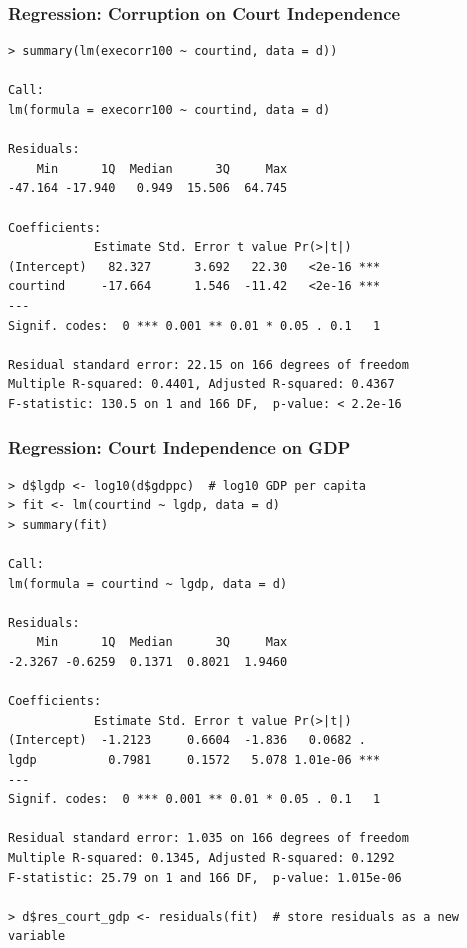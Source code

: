 \documentclass[xcolor=svgnames,9pt,english,aspectratio=169,t]{beamer}
\begin{document}
\begin{frame}[fragile]
\frametitle{Regression: Corruption on Court Independence}
\begin{Verbatim}[fontsize=\footnotesize, frame=single, label=R Code, commandchars=\\\{\}]
> summary(lm(execorr100 ~ courtind, data = d))

Call:
lm(formula = execorr100 ~ courtind, data = d)

Residuals:
    Min      1Q  Median      3Q     Max
-47.164 -17.940   0.949  15.506  64.745

Coefficients:
            Estimate Std. Error t value Pr(>|t|)
(Intercept)   82.327      3.692   22.30   <2e-16 ***
courtind     -17.664      1.546  -11.42   <2e-16 ***
---
Signif. codes:  0 *** 0.001 ** 0.01 * 0.05 . 0.1   1

Residual standard error: 22.15 on 166 degrees of freedom
Multiple R-squared: 0.4401,	Adjusted R-squared: 0.4367
F-statistic: 130.5 on 1 and 166 DF,  p-value: < 2.2e-16
\end{Verbatim}

\end{frame}

\begin{frame}[fragile]
\frametitle{Regression: Court Independence on GDP}
\footnotesize
{}
\begin{Verbatim}[fontsize=\footnotesize, frame=single, label=R Code, commandchars=\\\{\}]
> d$lgdp <- log10(d$gdppc)  # log10 GDP per capita
> fit <- lm(courtind ~ lgdp, data = d)
> summary(fit)

Call:
lm(formula = courtind ~ lgdp, data = d)

Residuals:
    Min      1Q  Median      3Q     Max
-2.3267 -0.6259  0.1371  0.8021  1.9460

Coefficients:
            Estimate Std. Error t value Pr(>|t|)
(Intercept)  -1.2123     0.6604  -1.836   0.0682 .
lgdp          0.7981     0.1572   5.078 1.01e-06 ***
---
Signif. codes:  0 *** 0.001 ** 0.01 * 0.05 . 0.1   1

Residual standard error: 1.035 on 166 degrees of freedom
Multiple R-squared: 0.1345,	Adjusted R-squared: 0.1292
F-statistic: 25.79 on 1 and 166 DF,  p-value: 1.015e-06

> d$res_court_gdp <- residuals(fit)  # store residuals as a new variable
\end{Verbatim}

\end{frame}
\end{document}
